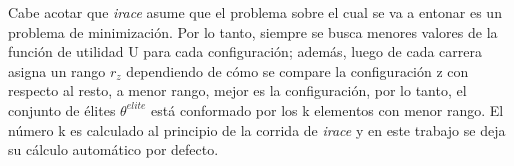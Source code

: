 
Cabe acotar que \emph{irace} asume que el problema sobre el cual se va a entonar es un problema de minimización. Por lo tanto, siempre se busca menores valores de la función de utilidad U para cada configuración; además, luego de cada carrera asigna un rango $r_z$ dependiendo de cómo se compare la configuración z con respecto al resto, a menor rango, mejor es la configuración, por lo tanto, el conjunto de élites $\theta^{elite}$ está conformado por los k elementos con menor rango. El número k es calculado al principio de la corrida de \emph{irace} y en este trabajo se deja su cálculo automático por defecto.




